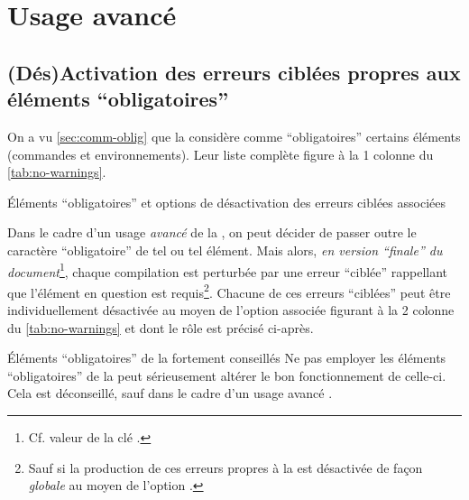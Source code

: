 \chapter{Usage avancé}\label{cha:usage-avance}

\section{(Dés)Activation des erreurs ciblées propres aux éléments
  \enquote{obligatoires}}\label{sec:non-affichage-cible}

On a vu \vref{sec:comm-oblig} que la \yatcl{} considère comme
\enquote{obligatoires} certains éléments (commandes et environnements). Leur
liste complète figure à la 1\iere{} colonne du \vref{tab:no-warnings}.
\begin{table}[ht]
  \centering
  
  \caption{Éléments \enquote{obligatoires} et options de désactivation des erreurs
    ciblées associées}
  \label{tab:no-warnings}
\end{table}

Dans le cadre d'un usage \emph{avancé} de la \yatcl{}, on peut décider de
passer outre le caractère \enquote{obligatoire} de tel ou tel élément.  Mais
alors, \emph{en version \enquote{finale} du document}\footnote{Cf. valeur
   de la clé .}, chaque compilation est
perturbée par une erreur \enquote{ciblée} rappellant que l'élément en question
est requis\footnote{Sauf si la production de ces erreurs propres à la \yatcl{}
  est désactivée de façon \emph{globale} au moyen de l'option
  .}.  Chacune de ces erreurs \enquote{ciblées} peut être
individuellement désactivée au moyen de l'option associée figurant à la
2\ieme{} colonne du \vref{tab:no-warnings} et dont le rôle est précisé
ci-après.

\begin{dbwarning}{Éléments \enquote{obligatoires} de la \yatcl{}
    fortement conseillés}{}
  Ne pas employer les éléments \enquote{obligatoires} de la \yatcl{} peut
  sérieusement altérer le bon fonctionnement de celle-ci. Cela est déconseillé,
  sauf dans le cadre d'un usage avancé .
\end{dbwarning}

